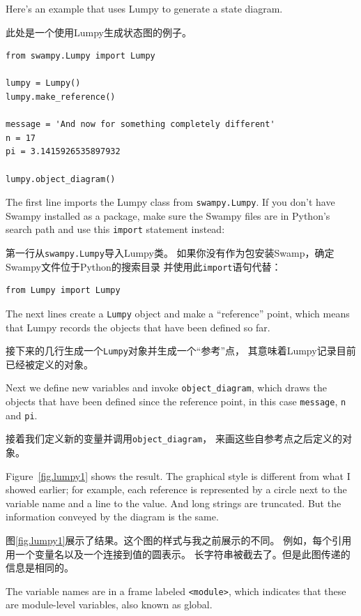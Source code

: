 \documentclass[10pt]{book}
\begin{document}
\begin{CJK}{UTF8}{gbsn}
Here's an example that uses Lumpy to generate a state diagram.
 

此处是一个使用Lumpy生成状态图的例子。

\begin{verbatim}
from swampy.Lumpy import Lumpy

lumpy = Lumpy()
lumpy.make_reference()

message = 'And now for something completely different'
n = 17
pi = 3.1415926535897932

lumpy.object_diagram()
\end{verbatim}

The first line imports the Lumpy class from {\tt swampy.Lumpy}.
If you don't have Swampy installed as a package, make sure
the Swampy files are in Python's search path and use this
{\tt import} statement instead:

第一行从{\tt swampy.Lumpy}导入Lumpy类。
如果你没有作为包安装Swamp，确定Swampy文件位于Python的搜索目录
并使用此{\tt import}语句代替：

\begin{verbatim}
from Lumpy import Lumpy
\end{verbatim}

The next lines create a {\tt Lumpy} object and make a ``reference''
point, which means that Lumpy records the objects that have been
defined so far.

接下来的几行生成一个{\tt Lumpy}对象并生成一个``参考''点，
其意味着Lumpy记录目前已经被定义的对象。

Next we define new variables and invoke \verb"object_diagram",
which draws the objects that have been defined since the reference
point, in this case {\tt message}, {\tt n} and {\tt pi}.

接着我们定义新的变量并调用\verb"object_diagram"，
来画这些自参考点之后定义的对象。

Figure~\ref{fig.lumpy1} shows the result.  The graphical style is
different from what I showed earlier; for example, each
reference is represented by a circle next to the variable name and a
line to the value.  And long strings are truncated.  But the
information conveyed by the diagram is the same.

图\ref{fig.lumpy1}展示了结果。这个图的样式与我之前展示的不同。
例如，每个引用用一个变量名以及一个连接到值的圆表示。
长字符串被截去了。但是此图传递的信息是相同的。

The variable names are in a frame labeled \verb"<module>", which
indicates that these are module-level variables, also known as
global.


\end{CJK}
\end{document}
